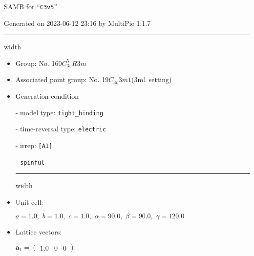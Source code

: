 \documentclass[fleqn,10pt,landscape]{article}
\begin{document}
\setcounter{MaxMatrixCols}{16}

\setlength{\baselineskip}{16pt}
\footnotesize
\begin{center}
\LARGE
SAMB for ``\texttt{C3v5}''
\end{center}
\begin{flushright}
Generated on 2023-06-12 23:16 by MultiPie 1.1.7
\end{flushright}
\vspace{1cm}


 \hfil \hrule height 1mm width \textwidth \hfil

\begin{itemize}
\item Group: No. 160\quad$C_{3v}^{5}$\quad$R3m$\quad[ trigonal ]

\item Associated point group: No. 19\quad$C_{3v}$\quad$3m1$\quad(3m1 setting)\quad[ trigonal ]

\vspace{5mm}

\item Generation condition

\quad - model type: \texttt{tight_binding}

\quad - time-reversal type: \texttt{electric}

\quad - irrep: \texttt{[A1]}

\quad - \texttt{spinful}


 \hfil \hrule height 1mm width \textwidth \hfil

\item Unit cell:

\quad $a=1.0,\,\, b=1.0,\,\, c=1.0,\,\, \alpha=90.0,\,\, \beta=90.0,\,\, \gamma=120.0$

\item Lattice vectors:

\quad $\bm{a}_1=\begin{pmatrix} 1.0 & 0 & 0 \end{pmatrix}$


\end{itemize}
\end{document}

